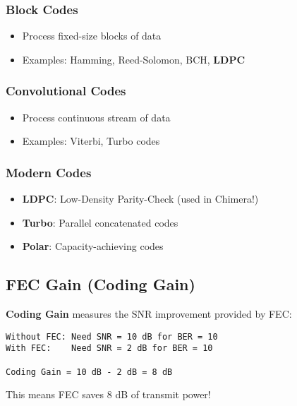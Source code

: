 \subsubsection{Block Codes}\label{block-codes}

\begin{itemize}
\tightlist
\item
  Process fixed-size blocks of data
\item
  Examples: Hamming, Reed-Solomon, BCH, \textbf{LDPC}
\end{itemize}

\subsubsection{Convolutional Codes}\label{convolutional-codes}

\begin{itemize}
\tightlist
\item
  Process continuous stream of data
\item
  Examples: Viterbi, Turbo codes
\end{itemize}

\subsubsection{Modern Codes}\label{modern-codes}

\begin{itemize}
\tightlist
\item
  \textbf{LDPC}: Low-Density Parity-Check (used in Chimera!)
\item
  \textbf{Turbo}: Parallel concatenated codes
\item
  \textbf{Polar}: Capacity-achieving codes
\end{itemize}

\subsection{FEC Gain (Coding Gain)}\label{fec-gain-coding-gain}

\textbf{Coding Gain} measures the SNR improvement provided by FEC:

\begin{verbatim}
Without FEC: Need SNR = 10 dB for BER = 10
With FEC:    Need SNR = 2 dB for BER = 10

Coding Gain = 10 dB - 2 dB = 8 dB
\end{verbatim}

This means FEC saves 8 dB of transmit power!

